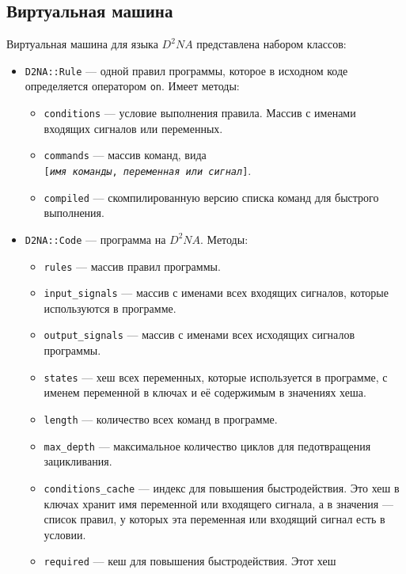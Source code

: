 \documentclass[utf8,a5paper,portrait,12pt]{eskdtext}
\begin{document}
\newpage
\subsection{Виртуальная машина}
Виртуальная машина для языка $D^2NA$ представлена набором классов:
\begin{itemize}
  \item \texttt{D2NA::Rule} — одной правил программы, которое в исходном коде
        определяется оператором \texttt{on}. Имеет методы:
        \begin{itemize}
          \item \texttt{conditions} — условие выполнения правила. Массив с
                именами входящих сигналов или переменных.
          \item \texttt{commands} — массив команд, вида\\
                \texttt{[\textit{имя команды}, \textit{переменная или сигнал}]}.
          \item \texttt{compiled} — скомпилированную версию списка команд для
                быстрого выполнения.
        \end{itemize}
  \item \texttt{D2NA::Code} — программа на $D^2NA$. Методы:
        \begin{itemize}
          \item \texttt{rules} — массив правил программы.
          \item \texttt{input\_signals} — массив с именами всех входящих
                сигналов, которые используются в программе.
          \item \texttt{output\_signals} — массив с именами всех исходящих
                сигналов программы.
          \item \texttt{states} — хеш всех переменных, которые используется
                в программе, с именем переменной в ключах и её содержимым в
                значениях хеша.
          \item \texttt{length} — количество всех команд в программе.
          \item \texttt{max\_depth} — максимальное количество циклов для
                педотвращения зацикливания.
          \item \texttt{conditions\_cache} — индекс для повышения
                быстродействия. Это хеш в ключах хранит имя переменной или
                входящего сигнала, а в значения — список правил, у которых эта
                переменная или входящий сигнал есть в условии.
          \item \texttt{required} — кеш для повышения быстродействия. Этот хеш

\end{itemize}
\end{itemize}
\end{document}
